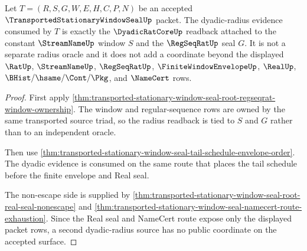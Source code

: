 \begin{theorem}
\label{thm:transported-stationary-window-seal-dyadic-radius-readback}
Let $T=(R,S,G,W,E,H,C,P,N)$ be an accepted $\TransportedStationaryWindowSealUp$ packet. The dyadic-radius evidence consumed by $T$ is exactly the $\DyadicRatCoreUp$ readback attached to the constant $\StreamNameUp$ window $S$ and the $\RegSeqRatUp$ seal $G$. It is not a separate radius oracle and it does not add a coordinate beyond the displayed $\RatUp$, $\StreamNameUp$, $\RegSeqRatUp$, $\FiniteWindowEnvelopeUp$, $\RealUp$, $\BHist/\hsame/\Cont/\Pkg$, and $\NameCert$ rows.
\end{theorem}
\begin{proof}
First apply \autoref{thm:transported-stationary-window-seal-root-regseqrat-window-ownership}. The window and regular-sequence rows are owned by the same transported source triad, so the radius readback is tied to $S$ and $G$ rather than to an independent oracle.

Then use \autoref{thm:transported-stationary-window-seal-tail-schedule-envelope-order}. The dyadic evidence is consumed on the same route that places the tail schedule before the finite envelope and Real seal.

The non-escape side is supplied by \autoref{thm:transported-stationary-window-seal-root-real-seal-nonescape} and \autoref{thm:transported-stationary-window-seal-namecert-route-exhaustion}. Since the Real seal and NameCert route expose only the displayed packet rows, a second dyadic-radius source has no public coordinate on the accepted surface.
\end{proof}

